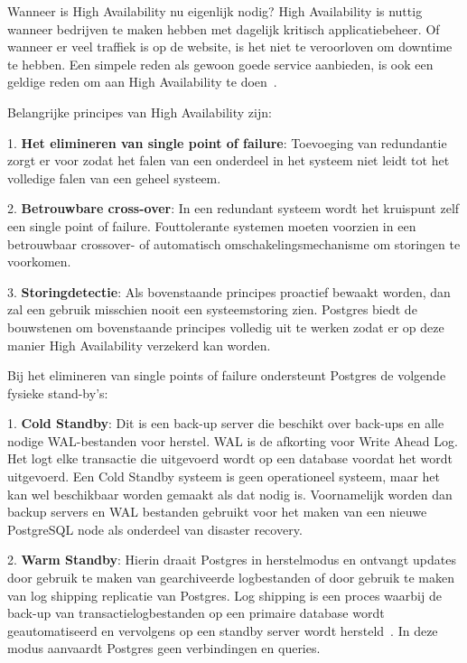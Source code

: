 Wanneer is High Availability nu eigenlijk nodig?
High Availability is nuttig wanneer bedrijven te maken hebben met dagelijk kritisch applicatiebeheer. Of wanneer er veel traffiek is op de website, is het niet te veroorloven om downtime te hebben. Een simpele reden als gewoon goede service aanbieden, is ook een geldige reden om aan High Availability te doen~\autocite{CriticalCase2020}. 


Belangrijke principes van High Availability zijn:

1. \textbf{Het elimineren van single point of failure}: Toevoeging van redundantie zorgt er voor zodat het falen van een onderdeel in het systeem niet leidt tot het volledige falen van een geheel systeem.

2. \textbf{Betrouwbare cross-over}: In een redundant systeem wordt het kruispunt zelf een single point of failure. Fouttolerante systemen moeten voorzien in een betrouwbaar crossover- of automatisch omschakelingsmechanisme om storingen te voorkomen.

3. \textbf{Storingdetectie}: Als bovenstaande principes proactief bewaakt worden, dan zal een gebruik misschien nooit een systeemstoring zien.
Postgres biedt de bouwstenen om bovenstaande principes volledig uit te werken zodat er op deze manier High Availability verzekerd kan worden.

Bij het elimineren van single points of failure ondersteunt Postgres de volgende fysieke stand-by's:

1. \textbf{Cold Standby}: Dit is een back-up server die beschikt over back-ups en alle nodige WAL-bestanden voor herstel. WAL is de afkorting voor Write Ahead Log. Het logt elke transactie die uitgevoerd wordt op een database voordat het wordt uitgevoerd. Een Cold Standby systeem is geen operationeel systeem, maar het kan wel beschikbaar worden gemaakt als dat nodig is. Voornamelijk worden dan backup servers en WAL bestanden gebruikt voor het maken van een nieuwe PostgreSQL node als onderdeel van disaster recovery.

2. \textbf{Warm Standby}: Hierin draait Postgres in herstelmodus en ontvangt updates door gebruik te maken van gearchiveerde logbestanden of door gebruik te maken van log shipping replicatie van Postgres. Log shipping is een proces waarbij de back-up van transactielogbestanden op een primaire database wordt geautomatiseerd en vervolgens op een standby server wordt hersteld~\autocite{Miller2016}. In deze modus aanvaardt Postgres geen verbindingen en queries.

